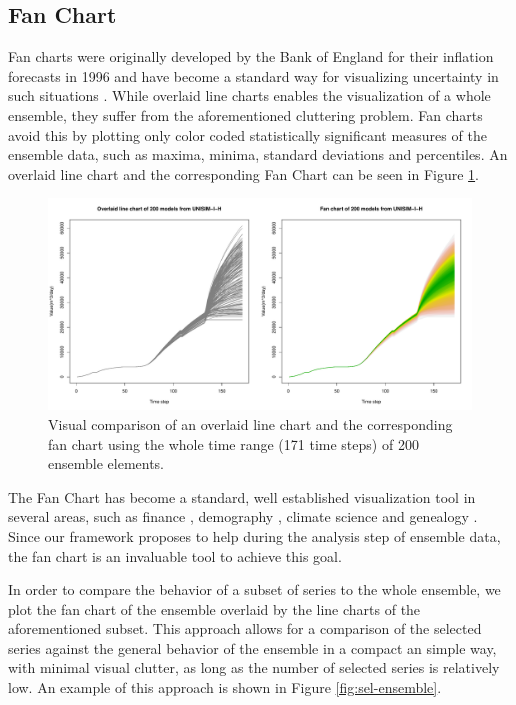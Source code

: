 \documentclass[final,5p,times,twocolumn]{elsarticle}
\begin{document}
\subsection{Fan Chart}
\label{sec:fan}
Fan charts were originally developed by the Bank of England for their inflation forecasts in 1996 \cite{fanchart-britton:1998} and have become a standard way for visualizing uncertainty in such situations \cite{rfanplot-abel:2015}. While overlaid line charts enables the visualization of a whole ensemble, they suffer from the aforementioned cluttering problem. Fan charts avoid this by plotting only color coded statistically significant measures of the ensemble data, such as maxima, minima, standard deviations and percentiles. An overlaid line chart and the corresponding Fan Chart can be seen in Figure \ref{fig:spag-fan}.

\begin{figure}[H]
  \centering
  \includegraphics[width=\columnwidth]{line-fan.pdf}
  \caption{Visual comparison of an overlaid line chart and the corresponding fan chart using the whole time range (171 time steps) of 200 ensemble elements.}
  \label{fig:spag-fan}
\end{figure}

The Fan Chart has become a standard, well established visualization tool in several areas, such as finance \cite{celasun:2006}, demography \cite{gerland:2014}, climate science \cite{mcshane:2011} and genealogy \cite{genealogy-draper:2008}. Since our framework proposes to help during the analysis step of ensemble data, the fan chart is an invaluable tool to achieve this goal.

In order to compare the behavior of a subset of series to the whole ensemble, we plot the fan chart of the ensemble overlaid by the line charts of the aforementioned subset. This approach allows for a comparison of the selected series against the general behavior of the ensemble in a compact an simple way, with minimal visual clutter, as long as the number of selected series is relatively low. An example of this approach is shown in Figure \ref{fig:sel-ensemble}.
\end{document}
